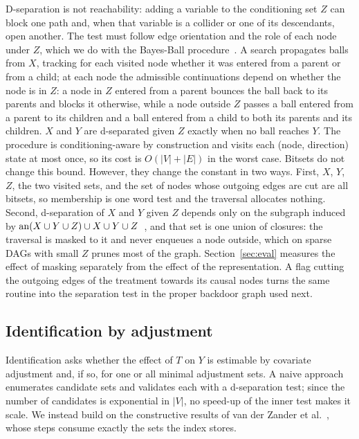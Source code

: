 D-separation is not reachability: adding a variable to the conditioning set
$Z$ can block one path and, when that variable is a collider or one of its
descendants, open another. The test must follow edge orientation and the role
of each node under $Z$, which we do with the Bayes-Ball
procedure~\cite{shachter1998bayesball}. A search propagates balls from $X$,
tracking for each visited node whether it was entered from a parent or from a
child; at each node the admissible continuations depend on whether the node is
in $Z$: a node in $Z$ entered from a parent bounces the ball back to its
parents and blocks it otherwise, while a node outside $Z$ passes a ball
entered from a parent to its children and a ball entered from a child to both
its parents and its children. $X$ and $Y$ are d-separated given $Z$ exactly
when no ball reaches $Y$. The procedure is conditioning-aware by construction
and visits each (node, direction) state at most once, so its cost is
$O(|V|+|E|)$ in the worst case. Bitsets do not change this bound. However,
they change the constant in two ways. First, $X$, $Y$, $Z$, the two visited
sets, and the set of nodes whose outgoing edges are cut are all bitsets, so
membership is one word test and the traversal allocates nothing. Second,
d-separation of $X$ and $Y$ given $Z$ depends only on the subgraph induced by
$\mathrm{an}(X \cup Y \cup Z) \cup X \cup Y \cup Z$~\cite{geiger1990identifying}, and
that set is one union of closures: the traversal is masked to it and never
enqueues a node outside, which on sparse DAGs with small $Z$ prunes most of
the graph. Section~\ref{sec:eval} measures the effect of masking separately
from the effect of the representation. A flag cutting the outgoing edges of
the treatment towards its causal nodes turns the same routine into the
separation test in the proper backdoor graph used next.

\subsection{Identification by adjustment}\label{sec:index:adj}

Identification asks whether the effect of $T$ on $Y$ is estimable by covariate
adjustment and, if so, for one or all minimal adjustment sets. A naive
approach enumerates candidate sets and validates each with a d-separation
test; since the number of candidates is exponential in $|V|$, no speed-up of
the inner test makes it scale. We instead build on the constructive results
of van der Zander et al.~\cite{vanderzander2014constructing,vanderzander2019separators},
whose steps consume exactly the sets the index stores.

